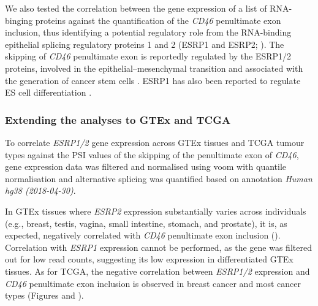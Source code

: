 We also tested the correlation between the gene expression of a list of RNA-binging proteins \cite{sebestyen:2016tr} against the quantification of the \emph{CD46} penultimate exon inclusion, thus identifying a potential regulatory role from the RNA-binding epithelial splicing regulatory proteins 1 and 2 (ESRP1 and ESRP2; ). The skipping of \emph{CD46} penultimate exon is reportedly regulated by the ESRP1/2 proteins, involved in the epithelial–mesenchymal transition and associated with the generation of cancer stem cells \cite{pradella:2017wp,warzecha:2010wi}. ESRP1 has also been reported to regulate ES cell differentiation \cite{fagoonee:2013vx}.

\subsubsection{Extending the analyses to GTEx and TCGA}

To correlate \emph{ESRP1/2} gene expression across GTEx tissues and TCGA tumour types against the PSI values of the skipping of the penultimate exon of \emph{CD46}, gene expression data was filtered and normalised using voom with quantile normalisation \cite{ritchie:2015tm} and alternative splicing was quantified based on annotation \emph{Human hg38 (2018-04-30)}.

In GTEx tissues where \emph{ESRP2} expression substantially varies across individuals (e.g., breast, testis, vagina, small intestine, stomach, and prostate), it is, as expected, negatively correlated with \emph{CD46} penultimate exon inclusion (). Correlation with \emph{ESRP1} expression cannot be performed, as the gene was filtered out for low read counts, suggesting its low expression in differentiated GTEx tissues. As for TCGA, the negative correlation between \emph{ESRP1/2} expression and \emph{CD46} penultimate exon inclusion is observed in breast cancer and most cancer types (Figures  and ).

